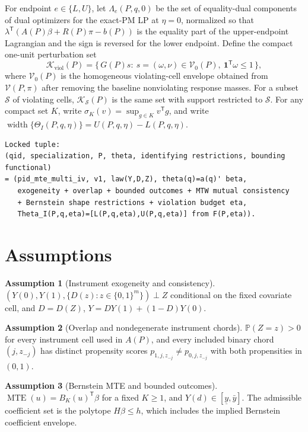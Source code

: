 \documentclass[11pt]{article}
\renewcommand{\Pr}{\mathbb{P}}
\newcommand{\transpose}{\mathsf{T}}
\theoremstyle{definition}
\newtheorem{assumption}{Assumption}
\theoremstyle{plain}
\theoremstyle{remark}
\begin{document}
For endpoint \(e\in\{L,U\}\), let \(\Lambda_e(P,q,0)\) be the set of equality-dual components of dual optimizers for the exact-PM LP at \(\eta=0\), normalized so that \(\lambda^\transpose(A(P)\beta+R(P)\pi-b(P))\) is the equality part of the upper-endpoint Lagrangian and the sign is reversed for the lower endpoint.  Define the compact one-unit perturbation set
\[
\mathcal K_{\mathrm{viol}}(P)=
\{\,G(P)s:\ s=(\omega,\nu)\in\mathcal V_0(P),\ \mathbf 1^\transpose\omega\le1\,\},
\]
where \(\mathcal V_0(P)\) is the homogeneous violating-cell envelope obtained from \(\mathcal V(P,\pi)\) after removing the baseline nonviolating response masses.  For a subset \(\mathcal S\) of violating cells, \(\mathcal K_{\mathcal S}(P)\) is the same set with support restricted to \(\mathcal S\).  For any compact set \(K\), write \(\sigma_K(v)=\sup_{g\in K}v^\transpose g\), and write \(\operatorname{width}\{\Theta_I(P,q,\eta)\}=U(P,q,\eta)-L(P,q,\eta)\).

\begin{verbatim}
Locked tuple:
(qid, specialization, P, theta, identifying restrictions, bounding functional)
= (pid_mte_multi_iv, v1, law(Y,D,Z), theta(q)=a(q)' beta,
   exogeneity + overlap + bounded outcomes + MTW mutual consistency
   + Bernstein shape restrictions + violation budget eta,
   Theta_I(P,q,eta)=[L(P,q,eta),U(P,q,eta)] from F(P,eta)).
\end{verbatim}

\section{Assumptions}
\begin{assumption}[Instrument exogeneity and consistency]\label{ass:exog}
\((Y(0),Y(1),\{D(z):z\in\{0,1\}^m\})\perp Z\) conditional on the fixed covariate cell, and \(D=D(Z)\), \(Y=DY(1)+(1-D)Y(0)\).
\end{assumption}

\begin{assumption}[Overlap and nondegenerate instrument chords]\label{ass:overlap}
\(\Pr(Z=z)>0\) for every instrument cell used in \(A(P)\), and every included binary chord \((j,z_{-j})\) has distinct propensity scores \(p_{1,j,z_{-j}}\ne p_{0,j,z_{-j}}\) with both propensities in \((0,1)\).
\end{assumption}

\begin{assumption}[Bernstein MTE and bounded outcomes]\label{ass:bernstein}
\(\operatorname{MTE}(u)=B_K(u)^\transpose\beta\) for a fixed \(K\ge1\), and \(Y(d)\in[\underline y,\bar y]\).  The admissible coefficient set is the polytope \(H\beta\le h\), which includes the implied Bernstein coefficient envelope.
\end{assumption}
\end{document}

